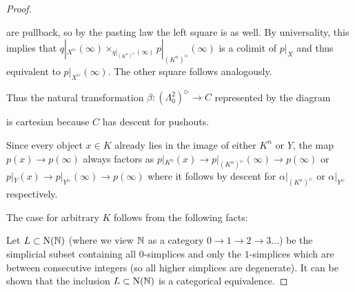 \begin{lemma}
\begin{proof}
\begin{center}
        \end{center}
        are pullback, so by the pasting law the left square is as well. 
        By universality, this implies that $q|_{X^{\rhd}}(\infty)\times_{q|_{\left(K^n\right)^{\rhd}}(\infty)}p|_{\left(K^n\right)^{\rhd}}(\infty)$ is a colimit of $p|_X$ and thus equivalent to $p|_{X^{\rhd}}(\infty)$.
        The other square follows analogously.

        Thus the natural transformation $\beta\colon\left(\Lambda_0^2\right)^{\rhd}\to C$ represented by the diagram
        \begin{center}
        \end{center}
        is cartesian because $C$ has descent for pushouts.

        Since every object $x\in K$ already lies in the image of either $K^n$ or $Y$, the map $p(x)\to p(\infty)$ always factors as $p|_{K^n}(x)\to p|_{\left(K^n\right)^{\rhd}}(\infty)\to p(\infty)$ or $p|_{Y}(x)\to p|_{Y^{\rhd}}(\infty)\to p(\infty)$ where it follows by descent for $\alpha|_{\left(K^n\right)^{\rhd}}$ or $\alpha|_{Y^{\rhd}}$ respectively.

        The case for arbitrary $K$ follows from the following facts:

        Let $L\subset\operatorname{N}(\mathbb{N})$ (where we view $\mathbb{N}$ as a category $0\to1\to2\to3\ldots$) be the simplicial subset containing all $0$-simplices and only the $1$-simplices which are between consecutive integers (so all higher simplices are degenerate).
        It can be shown that the inclusion $L\subset\operatorname{N}(\mathbb{N})$ is a categorical equivalence. %


\end{proof}
\end{lemma}
